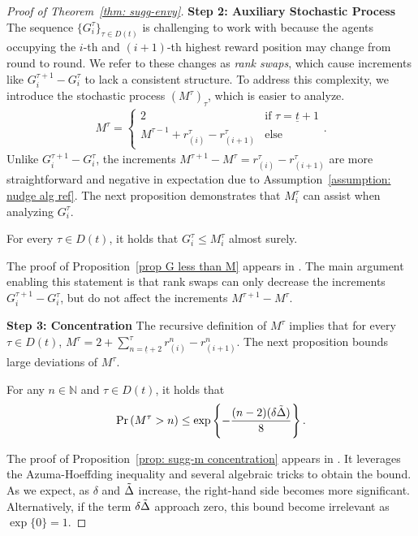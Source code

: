 \begin{proof}[Proof of Theorem~\ref{thm: sugg-envy}]
\textbf{Step 2: Auxiliary Stochastic Process}
The sequence $\{G_i^\tau\}_{\tau \in D(t)}$ is challenging to work with because the agents occupying the $i$-th and $(i+1)$-th highest reward position may change from round to round.  We refer to these changes as \emph{rank swaps}, which cause increments like  $G_i^{\tau+1} - G_i^\tau$ to lack a consistent structure. To address this complexity, we introduce the stochastic process $(M^\tau)_\tau$, which is easier to analyze.
\begin{align*}
    M^\tau =
    \begin{cases}
        2 & \text{if } \tau = \underline{t}+1 \\
        M^{\tau-1}+r^\tau_{(i)}-r^\tau_{(i+1)} & \text{else}
        \end{cases}.
\end{align*}
Unlike $G_i^{\tau+1}-G_i^{\tau}$, the increments $M^{\tau+1}-M^{\tau} = r^\tau_{(i)}-r^\tau_{(i+1)}$ are more straightforward and negative in expectation due to Assumption~\ref{assumption: nudge alg ref}. The next proposition demonstrates that $M^\tau_i$ can assist when analyzing $G^\tau_i$.
\begin{proposition}\label{prop G less than M}
For every $\tau \in D(t)$, it holds that $G^\tau_i \leq M^\tau_i$ almost surely.
\end{proposition}
The proof of Proposition~\ref{prop G less than M} appears in . The main argument enabling this statement is that rank swaps can only decrease the increments $G_i^{\tau+1}-G_i^{\tau}$, but do not affect the increments $M^{\tau+1}-M^{\tau}$.

\textbf{Step 3: Concentration}
The recursive definition of $M^\tau$ implies that for every $\tau \in D(t)$, $M^\tau = 2+ \sum_{n= \underline{t}+2 }^{\tau} r^n_{(i)}-r^n_{(i+1)}$. The next proposition bounds large deviations of $M^\tau$.
\begin{proposition}\label{prop: sugg-m concentration}
    For any $n \in \mathbb{N}$ and $\tau \in D(t)$, it holds that
    \begin{align*}
    \Pr\left( M^\tau > n \right)\leq \exp\left\{-\frac{(n-2)(\delta \tilde\Delta)}{8}\right\}.
    \end{align*}
\end{proposition}
The proof of Proposition~\ref{prop: sugg-m concentration} appears in . It leverages the Azuma-Hoeffding inequality and several algebraic tricks to obtain the bound. As we expect, as $\delta$ and $\tilde\Delta$ increase, the right-hand side becomes more significant. Alternatively, if the term $\delta \tilde\Delta$ approach zero, this bound become irrelevant as $\exp\{0\}=1$.


\end{proof}
